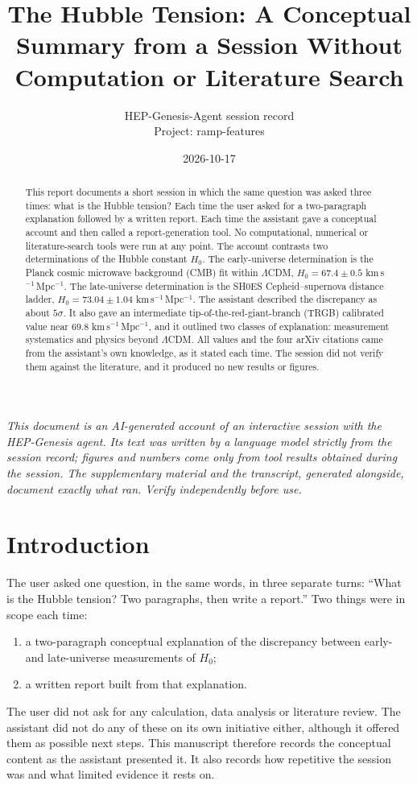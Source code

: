 \documentclass[11pt,a4paper]{article}
\title{The Hubble Tension: A Conceptual Summary from a Session Without Computation or Literature Search}
\author{HEP-Genesis-Agent session record \\ \small Project: ramp-features}
\date{2026-10-17}
\begin{document}
\maketitle
\noindent\textit{\small This document is an AI-generated account of an interactive session with the HEP-Genesis agent. Its text was written by a language model strictly from the session record; figures and numbers come only from tool results obtained during the session. The supplementary material and the transcript, generated alongside, document exactly what ran. Verify independently before use.}
\vspace{1em}

\begin{abstract}
This report documents a short session in which the same question was asked three times: what is the Hubble tension? Each time the user asked for a two-paragraph explanation followed by a written report. Each time the assistant gave a conceptual account and then called a report-generation tool. No computational, numerical or literature-search tools were run at any point. The account contrasts two determinations of the Hubble constant $H_0$. The early-universe determination is the Planck cosmic microwave background (CMB) fit within $\Lambda$CDM, $H_0 = 67.4 \pm 0.5$ km\,s$^{-1}$\,Mpc$^{-1}$. The late-universe determination is the SH0ES Cepheid--supernova distance ladder, $H_0 = 73.04 \pm 1.04$ km\,s$^{-1}$\,Mpc$^{-1}$. The assistant described the discrepancy as about $5\sigma$. It also gave an intermediate tip-of-the-red-giant-branch (TRGB) calibrated value near $69.8$ km\,s$^{-1}$\,Mpc$^{-1}$, and it outlined two classes of explanation: measurement systematics and physics beyond $\Lambda$CDM. All values and the four arXiv citations came from the assistant's own knowledge, as it stated each time. The session did not verify them against the literature, and it produced no new results or figures.
\end{abstract}

\section{Introduction}
The user asked one question, in the same words, in three separate turns: ``What is the Hubble tension? Two paragraphs, then write a report.'' Two things were in scope each time:
\begin{enumerate}
\item a two-paragraph conceptual explanation of the discrepancy between early- and late-universe measurements of $H_0$;
\item a written report built from that explanation.
\end{enumerate}
The user did not ask for any calculation, data analysis or literature review. The assistant did not do any of these on its own initiative either, although it offered them as possible next steps. This manuscript therefore records the conceptual content as the assistant presented it. It also records how repetitive the session was and what limited evidence it rests on.
\end{document}
